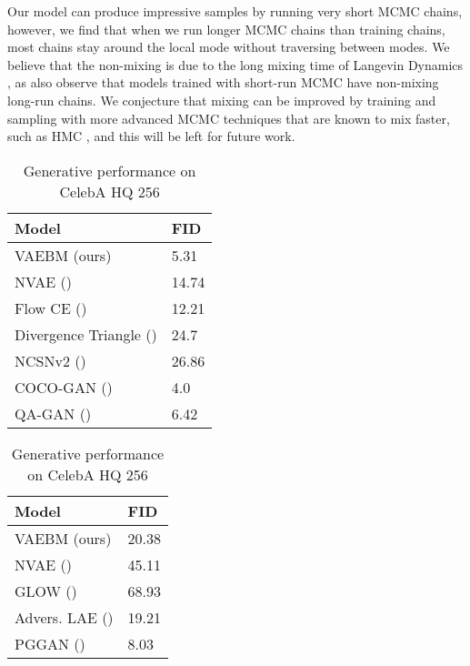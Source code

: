 \documentclass{article} \usepackage{iclr2021_conference,times}
\begin{document}
Our model can produce impressive samples by running very short MCMC chains, however, we find that when we run longer MCMC chains than training chains, most chains stay around the local mode without traversing between modes. We believe that the non-mixing is due to the long mixing time of Langevin Dynamics \cite{neal2011mcmc}, as \citet{nijkamp2019learning, nijkamp2019anatomy} also observe that models trained with short-run MCMC have non-mixing long-run chains. We conjecture that mixing can be improved by training and sampling with more advanced MCMC techniques that are known to mix faster, such as HMC \cite{neal2011mcmc}, and this will be left for future work.

\begin{table}[t]
\small
\begin{minipage}{.49\linewidth}
    \centering
\caption{Generative performance on CelebA 64}
\label{table celeba 64}
   \begin{tabular}{ll}
      Model & FID\\
      \hline
      VAEBM (ours) & 5.31\\
      \hline
      NVAE (\citeauthor{vahdat2020nvae}) & 14.74\\
      \hline
      Flow CE (\citeauthor{gao2020flow}) & 12.21\\
      Divergence Triangle (\citeauthor{han2020joint}) & 24.7 \\
      \hline
      \hline
      NCSNv2 (\citeauthor{song2020improved}) & 26.86 \\
      \hline
      COCO-GAN (\citeauthor{lin2019coco}) & 4.0 \\
      QA-GAN (\citeauthor{parimala2019quality}) & 6.42 \\
\hline
 \end{tabular}
\end{minipage}\hfill
\begin{minipage}{.5\linewidth}
    \centering
\caption{Generative performance on CelebA HQ 256}
\label{table celeba 256}
   \begin{tabular}{ll}
      Model & FID \\
      \hline
      VAEBM (ours) & 20.38\\
      \hline
      NVAE (\citeauthor{vahdat2020nvae}) & 45.11\\
      GLOW (\citeauthor{kingma2018glow})&68.93\\
      \hline
      \hline
      Advers. LAE (\citeauthor{pidhorskyi2020adversarial}) & 19.21\\
      PGGAN (\citeauthor{karras2017progressive}) & 8.03 \\
\hline
\end{tabular}
\end{minipage}\hfill
\end{table}
\end{document}

